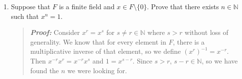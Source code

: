 \documentclass{article}
\newcommand{\NN}{\mathbb{N}}
\begin{document}
\begin{enumerate}
\item Suppose that $F$ is a finite field and $x\in F\setminus\{0\}$. Prove that there exists $n\in\NN$ such that $x^{n}=1$.
\begin{quote}
\textit{\textbf{Proof:}} Consider $x^{r}=x^{s}$ for $s\neq r\in\NN$ where $s>r$ without loss of generality. We know that for every element in $F$, there is a multiplicative inverse of that element, so we define $(x^{r})^{-1}=x^{-r}$. Then $x^{-r}x^{r}=x^{-r}x^{s}$ and $1=x^{s-r}$. Since $s>r$, $s-r\in\NN$, so we have found the $n$ we were looking for.
\end{quote}
\end{enumerate}
\end{document}
